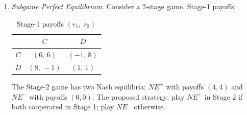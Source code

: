 \documentclass[12pt]{article}
\newenvironment{solution}{%
  \ifshowsolutions\begin{solutionbox}\noindent\textbf{\color{blue!70!black}Solution.}\quad\fi
  \ifshowsolutions\else\expandafter\comment\fi
}{%
  \ifshowsolutions\end{solutionbox}\fi
  \ifshowsolutions\else\expandafter\endcomment\fi
}
\begin{document}
\begin{enumerate}
\begin{enumerate}
\begin{solution}
    \textbf{Round 2.} $q=0$: $r_1(L)=0$, $r_1(R)=3$ $\Rightarrow$ Player 1 plays $R$ ($p\to0$). $p=1$: $r_2(U)=3$, $r_2(D)=0$ $\Rightarrow$ Player 2 plays $U$ ($q\to1$).

    The sequence $(p,q)$: $(\tfrac{1}{2},\tfrac{1}{2})\to(1,0)\to(0,1)\to(1,0)\to\cdots$. The process \textbf{cycles} and does not converge, reflecting the instability of the mixed NE.
  \end{solution}

  \item Trace \textbf{two full rounds} of \textbf{fictitious play} from the same starting point. Does fictitious play converge?

  \begin{solution}
    Initialize empirical frequencies at $\bar{q}_0=0.5$, $\bar{p}_0=0.5$ (prior counts equivalent to one half-observation each).

    \textbf{Round 1.} Best responses: Player 1 plays $L$ (since $4(0.5)>3(0.5)$); Player 2 plays $D$ (since $4(0.5)>3(0.5)$). Update with weight $\frac{1}{1+1}=0.5$ for the new observation: $\bar{q}_1 = 0.5(0.5)+0.5(0) = 0.25$; $\bar{p}_1 = 0.5(0.5)+0.5(1) = 0.75$.

    \textbf{Round 2.} Player 1: $r_1(L)=4(0.25)=1.0$, $r_1(R)=3(0.75)=2.25$ $\Rightarrow$ plays $R$. Player 2: $r_2(U)=3(0.75)=2.25$, $r_2(D)=4(0.25)=1.0$ $\Rightarrow$ plays $U$. Update (weight $\frac{1}{3}$): $\bar{q}_2=\frac{2(0.25)+1}{3}=0.5$; $\bar{p}_2=\frac{2(0.75)+0}{3}=0.5$.

    The empirical frequencies oscillate around $(p^*,q^*)=(\tfrac{4}{7},\tfrac{3}{7})$ with diminishing amplitude. Fictitious play is known to converge in 2-player games with this structure; the time-average empirical frequencies \textbf{converge to the mixed NE} $(\tfrac{4}{7},\tfrac{3}{7})$.
  \end{solution}
\end{enumerate}

\clearpage

\item \textit{Subgame Perfect Equilibrium.}
Consider a 2-stage game. Stage-1 payoffs:
\begin{table}[H]
  \centering
  \begin{tabular}{|c|c|c|}
    \hline
           & $C$        & $D$        \\\hline
    $C$    & $(6,\,6)$  & $(-1,\,8)$ \\\hline
    $D$    & $(8,\,-1)$ & $(1,\,1)$  \\\hline
  \end{tabular}
  \caption*{Stage-1 payoffs $(r_1,\;r_2)$}
\end{table}
The Stage-2 game has two Nash equilibria: $NE^+$ with payoffs $(4,4)$ and $NE^-$ with payoffs $(0,0)$. The proposed strategy: play $NE^+$ in Stage 2 if both cooperated in Stage 1; play $NE^-$ otherwise.


\end{enumerate}
\end{document}
